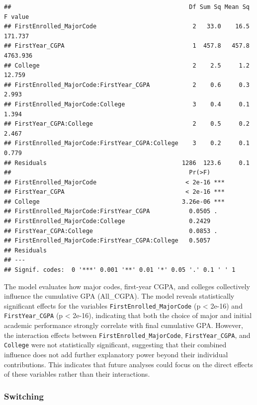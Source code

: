 \documentclass[
  12pt,
]{article}
\begin{document}
\begin{verbatim}
##                                                  Df Sum Sq Mean Sq  F value
## FirstEnrolled_MajorCode                           2   33.0    16.5  171.737
## FirstYear_CGPA                                    1  457.8   457.8 4763.936
## College                                           2    2.5     1.2   12.759
## FirstEnrolled_MajorCode:FirstYear_CGPA            2    0.6     0.3    2.993
## FirstEnrolled_MajorCode:College                   3    0.4     0.1    1.394
## FirstYear_CGPA:College                            2    0.5     0.2    2.467
## FirstEnrolled_MajorCode:FirstYear_CGPA:College    3    0.2     0.1    0.779
## Residuals                                      1286  123.6     0.1         
##                                                  Pr(>F)    
## FirstEnrolled_MajorCode                         < 2e-16 ***
## FirstYear_CGPA                                  < 2e-16 ***
## College                                        3.26e-06 ***
## FirstEnrolled_MajorCode:FirstYear_CGPA           0.0505 .  
## FirstEnrolled_MajorCode:College                  0.2429    
## FirstYear_CGPA:College                           0.0853 .  
## FirstEnrolled_MajorCode:FirstYear_CGPA:College   0.5057    
## Residuals                                                  
## ---
## Signif. codes:  0 '***' 0.001 '**' 0.01 '*' 0.05 '.' 0.1 ' ' 1
\end{verbatim}

The model evaluates how major codes, first-year CGPA, and colleges
collectively influence the cumulative GPA (All\_CGPA). The model reveals
statistically significant effects for the variables
\texttt{FirstEnrolled\_MajorCode} (p \textless{} 2e-16) and
\texttt{FirstYear\_CGPA} (p \textless{} 2e-16), indicating that both the
choice of major and initial academic performance strongly correlate with
final cumulative GPA. However, the interaction effects between
\texttt{FirstEnrolled\_MajorCode}, \texttt{FirstYear\_CGPA}, and
\texttt{College} were not statistically significant, suggesting that
their combined influence does not add further explanatory power beyond
their individual contributions. This indicates that future analyses
could focus on the direct effects of these variables rather than their
interactions.

\subsubsection{Switching}\label{switching}
\end{document}
